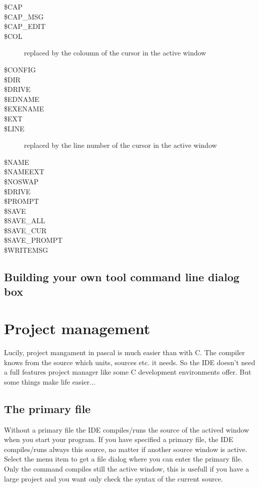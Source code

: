 \begin{description}
\item[\$CAP]
\item[\$CAP\_MSG]
\item[\$CAP\_EDIT]
\item[\$COL] replaced by the coloumn of the cursor in the active window
\item[\$CONFIG]
\item[\$DIR]
\item[\$DRIVE]
\item[\$EDNAME]
\item[\$EXENAME]
\item[\$EXT]
\item[\$LINE] replaced by the line number of the cursor in the active window
\item[\$NAME]
\item[\$NAMEEXT]
\item[\$NOSWAP]
\item[\$DRIVE]
\item[\$PROMPT]
\item[\$SAVE]
\item[\$SAVE\_ALL]
\item[\$SAVE\_CUR]
\item[\$SAVE\_PROMPT]
\item[\$WRITEMSG]
\end{description}

\subsection{Building your own tool command line dialog box}

\section{Project management}
\label{ide:projectmanagement}
Lucily, project mangament in pascal is much easier than with C. The
compiler knows from the source which units, sources etc. it needs.
So the \fpc IDE doesn't need a full features project manager like
some C development environments offer. But some things make life easier...

\subsection{The primary file}
Without a primary file the IDE compiles/runs the source of the actived
window when you start your program. If you have specified a primary
file, the IDE compiles/runs always this source, no matter if another
source window is active. Select the menu item 
to get a file dialog where you can enter the primary file. Only the command
 compiles still the active window, this is usefull
if you have a large project and you want only check the syntax of the
current source.

